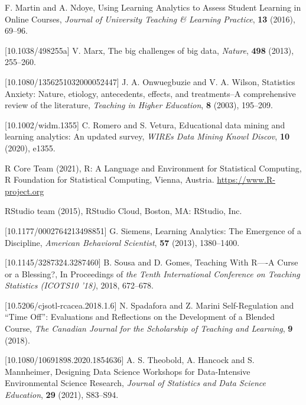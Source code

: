 \documentclass{aims}
\theoremstyle{definition}
\begin{document}
\begin{thebibliography}{99}
     \newblock  F. Martin and A. Ndoye,
     \newblock Using Learning Analytics to Assess Student Learning in Online Courses,
     \newblock \emph{Journal of University Teaching \& Learning Practice}, \textbf{13} (2016), 69--96.

 [10.1038/498255a]
     \newblock  V. Marx,
     \newblock The big challenges of big data,
     \newblock \emph{Nature}, \textbf{498} (2013), 255--260.

 [10.1080/1356251032000052447]
     \newblock J. A. Onwuegbuzie  and V. A. Wilson,
     \newblock Statistics Anxiety: Nature, etiology, antecedents, effects, and treatments--A comprehensive review of the literature,
     \newblock \emph{Teaching in Higher Education}, \textbf{8} (2003), 195--209.

 [10.1002/widm.1355]
     \newblock C. Romero and S. Vetura,
     \newblock Educational data mining and learning analytics: An updated survey,
     \newblock \emph{WIREs Data Mining Knowl Discov}, \textbf{10} (2020), e1355.

     \newblock R Core Team (2021),
     \newblock R: A Language and Environment for Statistical Computing,
     \newblock R Foundation for
  Statistical Computing, Vienna, Austria. \url{
  https://www.R-project.org}

     \newblock RStudio team (2015),
     \newblock RStudio Cloud,
     \newblock Boston, MA: RStudio, Inc.

 [10.1177/0002764213498851]
     \newblock G. Siemens,
     \newblock Learning Analytics: The Emergence of a Discipline,
     \newblock \emph{American Behavioral Scientist}, \textbf{57} (2013), 1380--1400.

 [10.1145/3287324.3287460]
     \newblock B. Sousa and D. Gomes,
     \newblock Teaching With R—-A Curse or a Blessing?,
     \newblock In Proceedings of \emph{the Tenth International Conference on Teaching Statistics (ICOTS10 '18)}, 2018, 672–678.

 [10.5206/cjsotl-rcacea.2018.1.6]
     \newblock N. Spadafora and Z. Marini
     \newblock Self-Regulation and “Time Off”: Evaluations and Reflections on the Development of a Blended Course,
     \newblock \emph{The Canadian Journal for the Scholarship of Teaching and Learning}, \textbf{9} (2018).

 [10.1080/10691898.2020.1854636]
     \newblock A. S. Theobold, A. Hancock and S. Mannheimer,
     \newblock  Designing Data Science Workshops for Data-Intensive Environmental Science Research,
     \newblock \emph{Journal of Statistics and Data Science Education}, \textbf{29} (2021), S83--S94.


\end{thebibliography}
\end{document}

